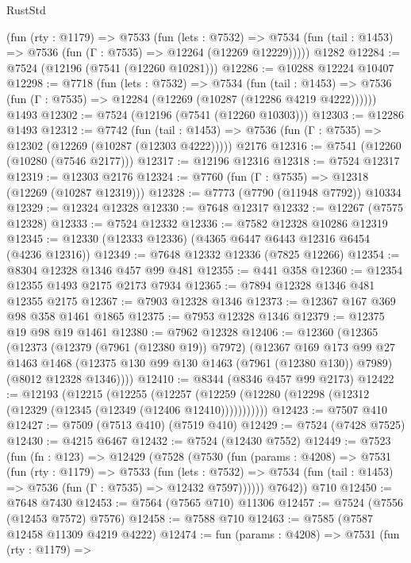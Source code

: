 \begin{lexlean}{RustStd}
\begin{coremodule}
    (fun (rty : @1179) =>
    @7533
      (fun (lets : @7532) =>
      @7534 (fun (tail : @1453) => @7536 (fun (Γ : @7535) => @12264 (@12269 @12229)))))
    @1282
@12284 := @7524 (@12196 (@7541 (@12260 @10281)))
@12286 := @10288 @12224 @10407
@12298 := @7718
    (fun (lets : @7532) =>
    @7534
      (fun (tail : @1453) =>
      @7536 (fun (Γ : @7535) => @12284 (@12269 (@10287 (@12286 @4219 @4222))))))
    @1493
@12302 := @7524 (@12196 (@7541 (@12260 @10303)))
@12303 := @12286 @1493
@12312 := @7742
    (fun (tail : @1453) => @7536 (fun (Γ : @7535) => @12302 (@12269 (@10287 (@12303 @4222)))))
    @2176
@12316 := @7541 (@12260 (@10280 (@7546 @2177)))
@12317 := @12196 @12316
@12318 := @7524 @12317
@12319 := @12303 @2176
@12324 := @7760 (fun (Γ : @7535) => @12318 (@12269 (@10287 @12319)))
@12328 := @7773 (@7790 (@11948 @7792)) @10334
@12329 := @12324 @12328
@12330 := @7648 @12317
@12332 := @12267 (@7575 @12328)
@12333 := @7524 @12332
@12336 := @7582 @12328 @10286 @12319
@12345 := @12330 (@12333 @12336) (@4365 @6447 @6443 @12316 @6454 (@4236 @12316))
@12349 := @7648 @12332 @12336 (@7825 @12266)
@12354 := @8304 @12328 @1346 @457 @99 @481
@12355 := @441 @358
@12360 := @12354 @12355 @1493 @2175 @2173 @7934
@12365 := @7894 @12328 @1346 @481 @12355 @2175
@12367 := @7903 @12328 @1346
@12373 := @12367 @167 @369 @98 @358 @1461 @1865
@12375 := @7953 @12328 @1346
@12379 := @12375 @19 @98 @19 @1461
@12380 := @7962 @12328
@12406 := @12360
    (@12365
      (@12373
        (@12379 (@7961 (@12380 @19)) @7972)
        (@12367
          @169
          @173
          @99
          @27
          @1463
          @1468
          (@12375 @130 @99 @130 @1463 (@7961 (@12380 @130)) @7989)
          (@8012 @12328 @1346))))
@12410 := @8344 (@8346 @457 @99 @2173)
@12422 := @12193
    (@12215
      (@12255
        (@12257 (@12259 (@12280 (@12298 (@12312 (@12329 (@12345 (@12349 (@12406 @12410)))))))))))
@12423 := @7507 @410
@12427 := @7509 (@7513 @410) (@7519 @410)
@12429 := @7524 (@7428 @7525)
@12430 := @4215 @6467
@12432 := @7524 (@12430 @7552)
@12449 := @7523
    (fun (fn : @123) =>
    @12429
      (@7528
        (@7530
          (fun (params : @4208) =>
          @7531
            (fun (rty : @1179) =>
            @7533
              (fun (lets : @7532) =>
              @7534 (fun (tail : @1453) => @7536 (fun (Γ : @7535) => @12432 @7597))))))
        @7642))
    @710
@12450 := @7648 @7430
@12453 := @7564 (@7565 @710) @11306
@12457 := @7524 (@7556 (@12453 @7572) @7576)
@12458 := @7588 @710
@12463 := @7585 (@7587 @12458 @11309 @4219 @4222)
@12474 := fun (params : @4208) =>
  @7531
    (fun (rty : @1179) =>

\end{coremodule}
\end{lexlean}
